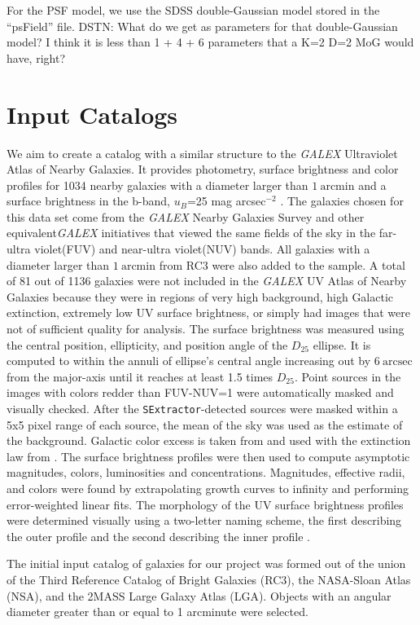\documentclass[12pt,preprint,pdftex]{aastex}
\newcommand{\units}[1]{\mathrm{#1}}
\renewcommand{\arcmin}{\units{arcmin}}
\renewcommand{\arcsec}{\units{arcsec}}
\begin{document}
For the PSF model, we use the SDSS double-Gaussian model stored in the
``psField'' file.  DSTN: What do we get as parameters for that
double-Gaussian model?  I think it is less than 1 + 4 + 6 parameters
that a K=2 D=2 MoG would have, right?

\section{Input Catalogs}
We aim to create a catalog with a similar structure to the
\textit{GALEX} Ultraviolet Atlas of Nearby Galaxies. It provides
photometry, surface brightness and color profiles for 1034 nearby
galaxies with a diameter larger than $1~\arcmin$ and a surface
brightness in the b-band, $u_B$=25 mag arcsec$^{-2}$ . The galaxies
chosen for this data set come from the \textit{GALEX} Nearby Galaxies
Survey and other equivalent\textit{GALEX} initiatives that viewed the
same fields of the sky in the far-ultra violet(FUV) and near-ultra
violet(NUV) bands. All galaxies with a diameter larger than
$1~\arcmin$ from RC3 were also added to the sample. A total of 81 out
of 1136 galaxies were not included in the \emph{GALEX} UV Atlas of
Nearby Galaxies because they were in regions of very high background,
high Galactic extinction, extremely low UV surface brightness, or
simply had images that were not of sufficient quality for
analysis. The surface brightness was measured using the central
position, ellipticity, and position angle of the $D_{25}$ ellipse. It is
computed to within the annuli of ellipse's central angle increasing
out by $6~\arcsec$ from the major-axis until it reaches at least 1.5
times $D_{25}$. Point sources in the images with colors redder than
FUV-NUV=1 were automatically masked and visually checked. After the
\verb|SExtractor|-detected\citep{sextractor} sources were masked within a 5x5 pixel
range of each source, the mean of the sky was used as the estimate of
the background. Galactic color excess is taken from
\cite{schlegel98} and used with the extinction law from
\cite{cardelli}. The surface brightness profiles were then used to
compute asymptotic magnitudes, colors, luminosities and
concentrations. Magnitudes, effective radii, and colors were found by
extrapolating growth curves to infinity and performing error-weighted
linear fits. The morphology of the UV surface brightness profiles were
determined visually using a two-letter naming scheme, the first
describing the outer profile and the second describing the inner
profile \citep{gdp06}.

The initial input catalog of galaxies for our project was formed out of the union of the Third
Reference Catalog of Bright Galaxies (RC3), the NASA-Sloan Atlas
(NSA), and the 2MASS Large Galaxy Atlas (LGA). Objects with an angular
diameter greater than or equal to 1 arcminute were selected. 
\end{document}

